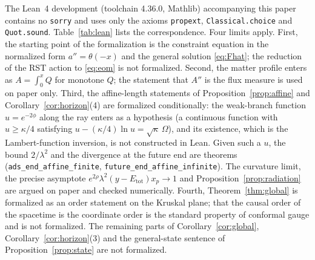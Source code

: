 \documentclass[11pt]{article}
\theoremstyle{remark}
\newcommand{\Etot}{E_{\mathrm{tot}}}
\newcommand{\lean}[1]{\texttt{#1}}
\begin{document}
The Lean~4 development (toolchain 4.36.0, Mathlib) accompanying this paper contains no \texttt{sorry} and uses only the axioms \texttt{propext}, \texttt{Classical.choice} and \texttt{Quot.sound}. Table~\ref{tab:lean} lists the correspondence. Four limits apply. First, the starting point of the formalization is the constraint equation in the normalized form $a''=\theta(-x)$ and the general solution \eqref{eq:Fhat}; the reduction of the RST action to \eqref{eq:eom} is not formalized. Second, the matter profile enters as $A=\int_0^xQ$ for monotone $Q$; the statement that $A''$ is the flux measure is used on paper only. Third, the affine-length statements of Proposition~\ref{prop:affine} and Corollary~\ref{cor:horizon}(4) are formalized conditionally: the weak-branch function $u=e^{-2\phi}$ along the ray enters as a hypothesis (a continuous function with $u\ge\kappa/4$ satisfying $u-(\kappa/4)\ln u=\sqrt\kappa\,\Omega$), and its existence, which is the Lambert-function inversion, is not constructed in Lean. Given such a $u$, the bound $2/\lambda^2$ and the divergence at the future end are theorems (\lean{ads\_end\_affine\_finite}, \lean{future\_end\_affine\_infinite}). The curvature limit, the precise asymptote $e^{2\rho}\lambda^2(y-\Etot)x_p\to1$ and Proposition~\ref{prop:radiation} are argued on paper and checked numerically. Fourth, Theorem~\ref{thm:global} is formalized as an order statement on the Kruskal plane; that the causal order of the spacetime is the coordinate order is the standard property of conformal gauge and is not formalized. The remaining parts of Corollary~\ref{cor:global}, Corollary~\ref{cor:horizon}(3) and the general-state sentence of Proposition~\ref{prop:state} are not formalized.
\end{document}
